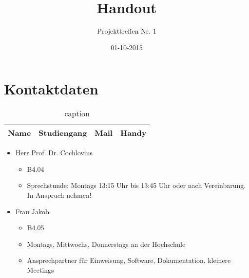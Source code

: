 \documentclass[a4paper,DIV=9,12pt]{scrreprt}
\begin{document}


\onehalfspace

\begin{titlepage}
    \title{Handout}
    \subtitle{Projekttreffen Nr. 1}
    \author{}
    \date{01-10-2015}
    \maketitle
    \thispagestyle{empty}
\end{titlepage}
\setcounter{page}{1}


\chapter{Kontaktdaten}

    \begin{table}[htpb]
        \centering
        \caption{caption}
        \label{tab:label}
        \begin{tabular}{l l l l}
            Name &  Studiengang & Mail & Handy \\
            \hline

            

        \end{tabular}
    \end{table}

    \begin{itemize}
        \item Herr Prof. Dr. Cochlovius

            \begin{itemize}
                \item B4.04
                \item Sprechstunde: Montags 13:15 Uhr bis 13:45 Uhr oder nach
                    Vereinbarung. In Anspruch nehmen!
            \end{itemize}

        \item Frau Jakob

            \begin{itemize}
                \item B4.05
                \item Montags, Mittwochs, Donnerstags an der Hochschule
                \item Ansprechpartner für Einweisung, Software, Dokumentation,
                    kleinere Meetings
            \end{itemize}
    \end{itemize}
\end{document}
